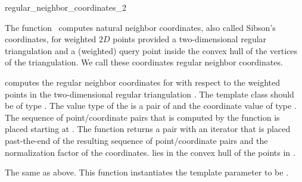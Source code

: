 
\begin{ccRefFunction}{regular_neighbor_coordinates_2}  %

\ccDefinition
  
The function \ccRefName\ computes natural neighbor coordinates, also
called Sibson's coordinates, for weighted $2D$ points provided a
two-dimensional regular triangulation and a (weighted) query point
inside the convex hull of the vertices of the triangulation. We call these 
coordinates regular neighbor coordinates.



 {
  computes the regular neighbor coordinates for  with respect
  to the weighted points in the two-dimensional regular triangulation
  .  The template class  should be of type
  .  The value type of the
   is a pair of  and the
  coordinate value of type . The sequence of
  point/coordinate pairs that is computed by the function is placed
  starting at . The function returns a pair with an iterator
  that is placed past-the-end of the resulting sequence of
  point/coordinate pairs and the normalization factor of the
  coordinates.
  \ccPrecond %
   lies in the convex hull of the
  points in .
  }  

%
{The same as above. This function instantiates the template parameter
   to be .}



\end{ccRefFunction}
